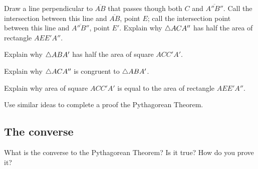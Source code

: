 \documentclass{ximera}
\begin{document}
\begin{question}
Draw a line perpendicular to $\overline{AB}$ that passes though both $C$
and $\overline{A'' B''}$. Call the intersection between this line and
$\overline{AB}$, point $E$; call the intersection point between this line
and $\overline{A''B''}$, point $E'$. Explain why $\triangle ACA''$ has half the
area of rectangle $AEE'A''$.
\end{question}

\begin{question}
Explain why $\triangle ABA'$ has half the area of square $ACC'A'$.
\end{question}

\begin{question}
Explain why $\triangle ACA''$ is congruent to $\triangle ABA'$. 
\end{question}

\begin{question}
Explain why area of square $ACC'A'$ is equal to the area of rectangle
$AEE'A''$.
\end{question}


\begin{question}
Use similar ideas to complete a proof the Pythagorean Theorem.
\end{question}


\subsection{The converse}

\begin{question} What is the converse to the Pythagorean Theorem? Is it true? How do you prove it?
\end{question}
\end{document}
